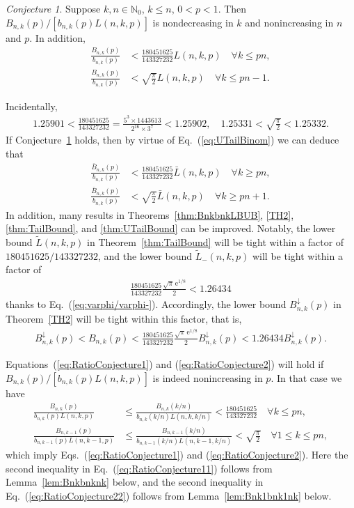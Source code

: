 \documentclass[aop]{imsart}
\theoremstyle{plain}
\theoremstyle{remark}
\newtheorem{conjecture}{Conjecture}
\newcommand{\rme}{\mathrm{e}}
\newcommand{\bbN}{\mathbb{N}}
\newcommand{\1}{\operatorname{\uppercase\expandafter{\romannumeral1}}}
\newcommand{\2}{\operatorname{\uppercase\expandafter{\romannumeral2}}}
\newcommand{\3}{\operatorname{\uppercase\expandafter{\romannumeral3}}}
\newcommand{\4}{\operatorname{\uppercase\expandafter{\romannumeral4}}}
\newcommand{\5}{\operatorname{\uppercase\expandafter{\romannumeral5}}}
\newcommand{\6}{\operatorname{\uppercase\expandafter{\romannumeral6}}}
\newcommand{\7}{\operatorname{\uppercase\expandafter{\romannumeral7}}}
\newcommand{\8}{\operatorname{\uppercase\expandafter{\romannumeral8}}}
\newcommand{\9}{\operatorname{\uppercase\expandafter{\romannumeral9}}}
\newcommand{\eref}[1]{Eq.~\textup{(\ref{#1})}}
\newcommand{\eqsref}[2]{Eqs.~(\ref{#1}) and (\ref{#2})}
\newcommand{\Eqsref}[2]{Equations~(\ref{#1}) and (\ref{#2})}
\newcommand{\thref}[1]{Theorem~\ref{#1}}
\newcommand{\thsref}[1]{Theorems~\ref{#1}}
\newcommand{\lref}[1]{Lemma~\ref{#1}}
\newcommand{\cref}[1]{Conjecture~\ref{#1}}
\begin{document}
\begin{conjecture}\label{con:RatioConjecture}
	Suppose  $k,n\in \bbN_0$, $k\leq n$,   $0<p<1$. Then $B_{n,k}(p)/[b_{n,k}(p) L(n,k,p)]$  is nondecreasing in $k$ and nonincreasing in $n$ and $p$. In addition,
\begin{align}
	\frac{B_{n,k}(p)}{b_{n,k}(p)}&< \frac{180451625}{143327232} L(n,k,p) \quad \forall k\leq p n, \label{eq:RatioConjecture1}\\
	\frac{B_{n,k}(p)}{b_{n,k}(p)}&< \sqrt{\frac{\pi}{2}}L(n,k,p)\quad \forall k\leq pn-1. \label{eq:RatioConjecture2}
	\end{align}	
\end{conjecture}
Incidentally,
\begin{align}
1.25901<\frac{180451625}{143327232}=\frac{5^3\times 1443613}{2^{16}\times3^7}<1.25902, \quad 1.25331 <\sqrt{\frac{\pi}{2}}<1.25332. 
\end{align}
If \cref{con:RatioConjecture} holds, then by virtue of  \eref{eq:UTailBinom} we can deduce that
\begin{align}
\frac{\bar{B}_{n,k}(p)}{b_{n,k}(p)}&< \frac{180451625}{143327232} \bar{L}(n,k,p) \quad \forall k\geq p n,\\
\frac{\bar{B}_{n,k}(p)}{b_{n,k}(p)}&< \sqrt{\frac{\pi}{2}}\bar{L}(n,k,p) \quad \forall k\geq pn+1.
\end{align}	
In addition, many results in \thsref{thm:BnkbnkLBUB}, \ref{TH2}, \ref{thm:TailBound}, and \ref{thm:UTailBound} can be improved. Notably, the lower bound  $\tilde{L}(n,k,p)$ in \thref{thm:TailBound} will be tight within a factor of $180451625/143327232$, and the lower bound
$\tilde{L}_-(n,k,p)$ will be tight within a factor of 
\begin{align}
\frac{180451625}{143327232}\frac{\sqrt{\pi}\,\rme^{1/8}}{2}< 1.26434
\end{align}
thanks to \eref{eq:varphi/varphi-}. Accordingly,
the lower bound $B_{n,k}^{\downarrow}(p)$ in \thref{TH2} will be tight within this factor,  that is,
\begin{align}
B_{n,k}^{\downarrow}(p)< B_{n,k}(p)<   \frac{180451625}{143327232}\frac{\sqrt{\pi}\,\rme^{1/8}}{2}B_{n,k}^{\downarrow}(p)< 1.26434 B_{n,k}^{\downarrow}(p). 
\end{align}



\Eqsref{eq:RatioConjecture1}{eq:RatioConjecture2} will hold if $B_{n,k}(p)/[b_{n,k}(p) L(n,k,p)]$  is indeed nonincreasing in $p$. In that case we have
\begin{align}
\frac{B_{n,k}(p)}{b_{n,k}(p)L(n,k,p)}&\leq \frac{B_{n,k}(k/n)}{b_{n,k}(k/n)L(n,k,k/n)}
< \frac{180451625}{143327232}  \quad \forall k\leq p n, \label{eq:RatioConjecture11} \\
\frac{B_{n,k-1}(p)}{b_{n,k-1}(p)L(n,k-1,p)}&\leq \frac{B_{n,k-1}(k/n)}{b_{n,k-1}(k/n)L(n,k-1,k/n)}< \sqrt{\frac{\pi}{2}}\quad \forall 1\leq k\leq pn,  \label{eq:RatioConjecture22}
\end{align}
which imply \eqsref{eq:RatioConjecture1}{eq:RatioConjecture2}. Here the second inequality in \eref{eq:RatioConjecture11} follows from \lref{lem:Bnkbnknk} below, and the second
 inequality in \eref{eq:RatioConjecture22} follows from \lref{lem:Bnk1bnk1nk} below. 
\end{document}
